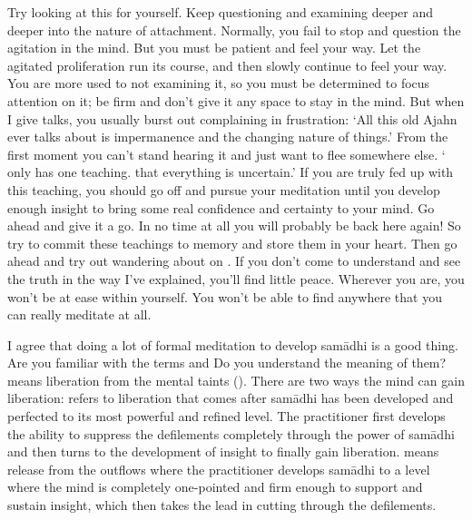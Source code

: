 Try looking at this for yourself. Keep questioning and examining deeper and deeper into the nature of attachment. Normally, you fail to stop and question the agitation in the mind. But you must be patient and feel your way. Let the agitated proliferation run its course, and then slowly continue to feel your way. You are more used to not examining it, so you must be determined to focus attention on it; be firm and don't give it any space to stay in the mind. But when I give talks, you usually burst out complaining in frustration: `All this old Ajahn ever talks about is impermanence and the changing nature of things.' From the first moment you can't stand hearing it and just want to flee somewhere else. ` only has one teaching. that everything is uncertain.' If you are truly fed up with this teaching, you should go off and pursue your meditation until you develop enough insight to bring some real confidence and certainty to your mind. Go ahead and give it a go. In no time at all you will probably be back here again! So try to commit these teachings to memory and store them in your heart. Then go ahead and try out wandering about on . If you don't come to understand and see the truth in the way I've explained, you'll find little peace. Wherever you are, you won't be at ease within yourself. You won't be able to find anywhere that you can really meditate at all.

I agree that doing a lot of formal meditation to develop sam\=adhi is a good thing. Are you familiar with the terms  and  Do you understand the meaning of them?  means liberation from the mental taints (). There are two ways the mind can gain liberation:  refers to liberation that comes after sam\=adhi has been developed and perfected to its most powerful and refined level. The practitioner first develops the ability to suppress the defilements completely through the power of sam\=adhi and then turns to the development of insight to finally gain liberation.  means release from the outflows where the practitioner develops sam\=adhi to a level where the mind is completely one-pointed and firm enough to support and sustain insight, which then takes the lead in cutting through the defilements.

